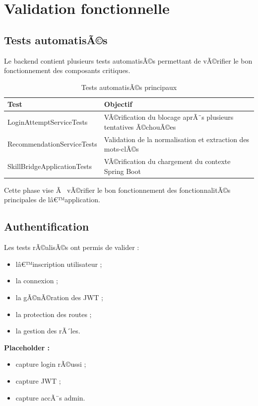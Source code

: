 ﻿\documentclass[12pt,a4paper]{report}
\begin{document}
\section{Validation fonctionnelle}

\subsection{Tests automatisÃ©s}

Le backend contient plusieurs tests automatisÃ©s permettant de vÃ©rifier le bon fonctionnement des composants critiques.

\begin{table}[H]
\centering
\caption{Tests automatisÃ©s principaux}
\begin{tabular}{|p{6cm}|p{7cm}|}
\hline
\textbf{Test} & \textbf{Objectif} \\
\hline
LoginAttemptServiceTests & VÃ©rification du blocage aprÃ¨s plusieurs tentatives Ã©chouÃ©es \\
\hline
RecommendationServiceTests & Validation de la normalisation et extraction des mots-clÃ©s \\
\hline
SkillBridgeApplicationTests & VÃ©rification du chargement du contexte Spring Boot \\
\hline
\end{tabular}
\end{table}

Cette phase vise Ã  vÃ©rifier le bon fonctionnement des fonctionnalitÃ©s principales de lâ€™application.

\subsection{Authentification}

Les tests rÃ©alisÃ©s ont permis de valider :
\begin{itemize}
    \item lâ€™inscription utilisateur ;
    \item la connexion ;
    \item la gÃ©nÃ©ration des JWT ;
    \item la protection des routes ;
    \item la gestion des rÃ´les.
\end{itemize}

\vspace{0.3cm}

\textbf{Placeholder :}
\begin{itemize}
    \item capture login rÃ©ussi ;
    \item capture JWT ;
    \item capture accÃ¨s admin.
\end{itemize}
\end{document}
